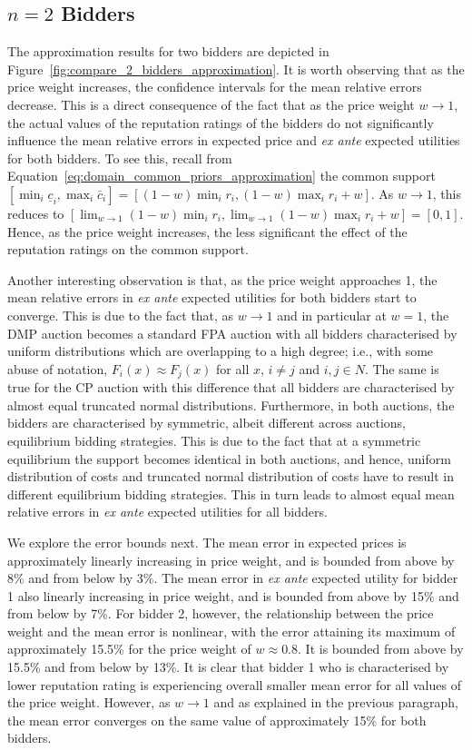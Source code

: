 \subsection{$n=2$ Bidders} %
\label{sub:n_2_bidders_approximation}
The approximation results for two bidders are depicted in Figure~\ref{fig:compare_2_bidders_approximation}. It is worth observing that as the price weight increases, the confidence intervals for the mean relative errors decrease. This is a direct consequence of the fact that as the price weight $w\to 1$, the actual values of the reputation ratings of the bidders do not significantly influence the mean relative errors in expected price and \emph{ex ante} expected utilities for both bidders. To see this, recall from Equation~\eqref{eq:domain_common_priors_approximation} the common support $[\min_i{\underline{c}_i}, \max_i{\bar{c}_i}]=[(1-w)\min_i{r_i}, (1-w)\max_i{r_i} + w]$. As $w\to 1$, this reduces to $[\lim_{w\to 1}(1-w)\min_i{r_i}, \lim_{w\to 1}(1-w)\max_i{r_i} + w] = [0,1]$. Hence, as the price weight increases, the less significant the effect of the reputation ratings on the common support.

Another interesting observation is that, as the price weight approaches 1, the mean relative errors in \emph{ex ante} expected utilities for both bidders start to converge. This is due to the fact that, as $w\to 1$ and in particular at $w=1$, the DMP auction becomes a standard FPA auction with all bidders characterised by uniform distributions which are overlapping to a high degree; i.e., with some abuse of notation, $F_i(x)\approx F_j(x)$ for all $x$, $i\neq j$ and $i,j\in N$. The same is true for the CP auction with this difference that all bidders are characterised by almost equal truncated normal distributions. Furthermore, in both auctions, the bidders are characterised by symmetric, albeit different across auctions, equilibrium bidding strategies. This is due to the fact that at a symmetric equilibrium the support becomes identical in both auctions, and hence, uniform distribution of costs and truncated normal distribution of costs have to result in different equilibrium bidding strategies. This in turn leads to almost equal mean relative errors in \emph{ex ante} expected utilities for all bidders.

We explore the error bounds next. The mean error in expected prices is approximately linearly increasing in price weight, and is bounded from above by 8\% and from below by 3\%. The mean error in \emph{ex ante} expected utility for bidder 1 also linearly increasing in price weight, and is bounded from above by 15\% and from below by 7\%. For bidder 2, however, the relationship between the price weight and the mean error is nonlinear, with the error attaining its maximum of approximately 15.5\% for the price weight of $w\approx 0.8$. It is bounded from above by 15.5\% and from below by 13\%. It is clear that bidder 1 who is characterised by lower reputation rating is experiencing overall smaller mean error for all values of the price weight. However, as $w\to 1$ and as explained in the previous paragraph, the mean error converges on the same value of approximately 15\% for both bidders.

